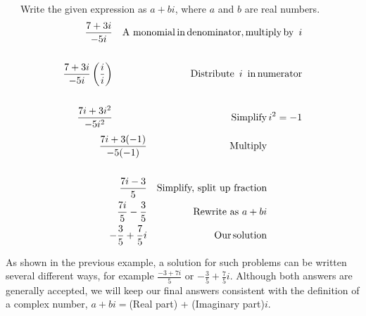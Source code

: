 \begin{example}~~~Write the given expression as $a+bi$, where $a$ and $b$ are real numbers.
  \begin{eqnarray*}
    \frac{7 + 3 i}{- 5 i} &  & \tmop{A~monomial} \tmop{in}
    \tmop{denominator}, \tmop{multiply} \tmop{by~} i\\
    &  & \\
    \frac{7 + 3 i}{- 5 i} \left( \frac{i}{i} \right) &  & \tmop{Distribute~} i
    \tmop{~in} \tmop{numerator}\\
  	&  & \\
    \frac{7 i + 3 i^2}{- 5 i^2} &  & \tmop{Simplify} i^2 = - 1%
  \end{eqnarray*}
	\begin{eqnarray*}
	  \frac{7 i + 3 (- 1)}{- 5 (- 1)} &  & \operatorname{Multiply}\\
    &  & \\
    \frac{7 i - 3}{5} & & \text{Simplify, split up fraction}\\
		\frac{7 i}{5} - \frac{3}{5} & & \text{Rewrite as~}a+bi\\
		-\frac{3}{5} + \frac{7}{5} i &  & \operatorname{Our} \operatorname{solution}
  \end{eqnarray*}
\end{example}

As shown in the previous example, a solution for such problems can be written several different ways, for
example $\frac{- 3 + 7 i}{5}$ or $-\frac{3}{5} + \frac{7}{5} i$.  Although both answers are generally accepted, we will keep our final answers consistent with the definition of a complex number, $a+bi=$(Real part) + (Imaginary part)$i$.

